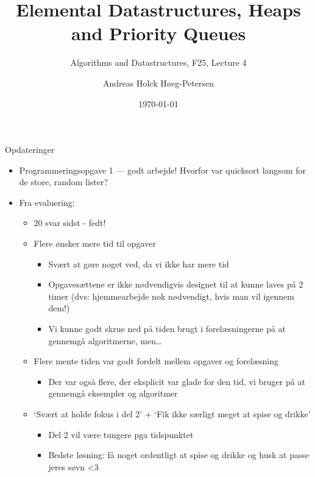 \documentclass[aspectratio=1610]{beamer}
\title[ALG25 - Lecture 4]
{Elemental Datastructures, Heaps and Priority Queues}
\subtitle
{Algorithms and Datastructures, F25, Lecture 4}
\author[Andreas H. Høeg-Petersen]
{Andreas Holck Høeg-Petersen}
\institute[AAU]{%
  Department of Computer Science\\
  Aalborg University
}
\date {\today}
\begin{document}
\begin{frame}
  \titlepage
\end{frame}

\begin{frame}{Opdateringer}{}
    \begin{itemize}[<+->]
        \small
        \item Programmeringsopgave 1 --- godt arbejde! Hvorfor var quicksort
            langsom for de store, random lister?
        \item Fra evaluering:
            \begin{itemize}
                \item 20 svar sidst - fedt!
                \item Flere ønsker mere tid til opgaver
                    \begin{itemize}
                        \item Svært at gøre noget ved, da vi ikke har mere tid
                        \item Opgavesættene er ikke nødvendigvis designet til at
                            kunne laves på 2 timer (dvs: hjemmearbejde nok
                            nødvendigt, hvis man vil igennem dem!)
                        \item Vi kunne godt skrue ned på tiden brugt i
                            forelæsningerne på at gennemgå algoritmerne, men\ldots
                    \end{itemize}
                \item Flere mente tiden var godt fordelt mellem opgaver og
                    forelæsning
                    \begin{itemize}
                        \item Der var også flere, der eksplicit var glade for
                            den tid, vi bruger på at gennemgå eksempler og
                            algoritmer
                    \end{itemize}
                \item `Svært at holde fokus i del 2' + `Fik ikke særligt meget
                    at spise og drikke'
                    \begin{itemize}
                        \item Del 2 \alert{vil være tungere} pga tidspunktet
                        \item Bedste løsning: få noget ordentligt at spise og
                            drikke og husk at passe jeres søvn <3 
                    \end{itemize}
            \end{itemize}
    \end{itemize}
\end{frame}
\end{document}
